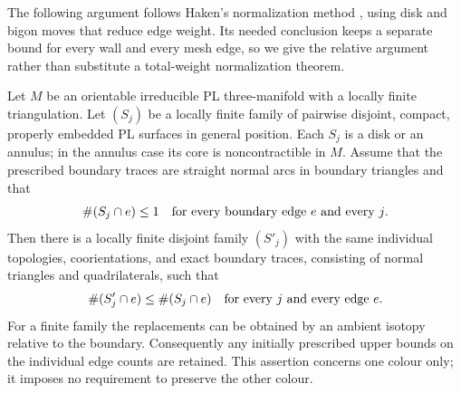 The following argument follows Haken's normalization method
\cite[Chapter~I, \S5]{Haken1961}, using disk and bigon moves that reduce
edge weight.  Its needed conclusion keeps a separate
bound for every wall and every mesh edge, so we give the relative
argument rather than substitute a total-weight normalization theorem.

\begin{proposition}
\label{wl:normalization}
Let $M$ be an orientable irreducible PL three-manifold with a locally finite
triangulation.  Let $(S_j)$ be a locally finite family of pairwise disjoint,
compact, properly embedded PL surfaces in general position.  Each $S_j$ is a
disk or an annulus; in the annulus case its core is noncontractible in $M$.
Assume that the prescribed boundary traces are straight normal arcs in boundary
triangles and that
\[
                  \#(S_j\cap e)\leq 1
       \quad\hbox{for every boundary edge $e$ and every $j$}.
\]
Then there is a locally finite disjoint family $(S'_j)$ with the same individual
topologies, coorientations, and exact boundary traces, consisting of normal
triangles and quadrilaterals, such that
\[
                  \#(S'_j\cap e)\leq\#(S_j\cap e)
                    \quad\hbox{for every $j$ and every edge $e$}.
\]
For a finite family the replacements can be obtained by an ambient isotopy
relative to the boundary.  Consequently any initially prescribed upper bounds
on the individual edge counts are retained.  This assertion concerns one
colour only; it imposes no requirement to preserve the other colour.
\end{proposition}

